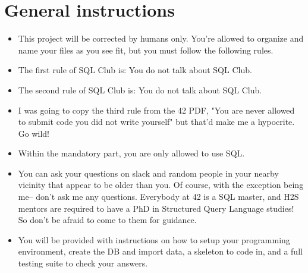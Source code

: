 \documentclass{42-en}
\begin{document}
\chapter{General instructions}

	\begin{itemize}\itemsep1pt 
		\item This project will be corrected by humans only. 
			You're allowed to organize and name your files as you see 
			fit, but you must follow the following rules. 
		\item The first rule of SQL Club is: You do not talk about SQL Club.
		\item The second rule of SQL Club is: You do not talk about SQL Club.
		\item I was going to copy the third rule from the 42 PDF, "You are never allowed 
			to submit code you did not write yourself" but that'd make me a hypocrite. 
			Go wild!
		\item Within the mandatory part, you are only allowed to use SQL. 
		\item You can ask your questions on slack and random people in your nearby vicinity 
			that appear to be older than you. Of course, with the exception being me-- don't ask me 
			any questions. Everybody at 42 is a SQL master, and H2S mentors are required 
			to have a PhD in Structured Query Language studies! So don't be afraid to 
			come to them for guidance.
		\item You will be provided with instructions on how to setup your programming environment, create the DB 
			and import data, a skeleton to code in, and a full testing suite to check your answers.
	\end{itemize}

\startexercices

\end{document}
